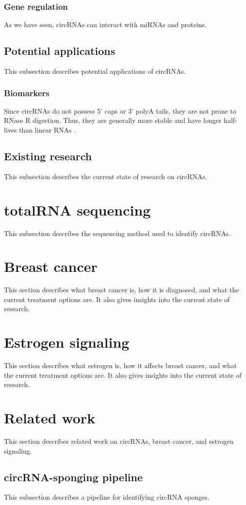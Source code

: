 \subsubsection{Gene regulation}
As we have seen, circRNAs can interact with miRNAs and proteins.

\subsection{Potential applications}
This subsection describes potential applications of circRNAs.

\subsubsection{Biomarkers}
Since circRNAs do not possess 5' caps or 3' polyA tails, they are not prone to
RNase R digestion. Thus, they are generally more stable and have longer
half-lives than linear RNAs \supercite{kristensen_biogenesis_2019}.

\subsection{Existing research}
This subsection describes the current state of research on circRNAs.

\section{totalRNA sequencing}
This subsection describes the sequencing method used to identify circRNAs.

\lipsum[2]

\section{Breast cancer}
This section describes what breast cancer is, how it is diagnosed, and what the
current treatment options are. It also gives insights into the current state of
research.

\lipsum[3]

\section{Estrogen signaling}
This section describes what estrogen is, how it affects breast cancer, and what
the current treatment options are. It also gives insights into the current state
of research.

\lipsum[4]

\section{Related work}
This section describes related work on circRNAs, breast cancer, and estrogen
signaling.

\subsection{circRNA-sponging pipeline}
This subsection describes a pipeline for identifying circRNA sponges.